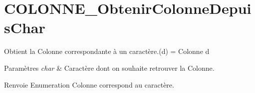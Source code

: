 \hypertarget{COLONNE_ObtenirColonneDepuisChar-example}{}\section{C\+O\+L\+O\+N\+N\+E\+\_\+\+Obtenir\+Colonne\+Depuis\+Char}
Obtient la Colonne correspondante à un caractère.(\textquotesingle{}d\textquotesingle{}) = Colonne d


\begin{DoxyParams}{Paramètres}
{\em char} & Caractère dont on souhaite retrouver la Colonne.\\
\hline
\end{DoxyParams}
\begin{DoxyReturn}{Renvoie}
Enumeration Colonne correspond au caractère.
\end{DoxyReturn}

\begin{DoxyCodeInclude}
\end{DoxyCodeInclude}
 